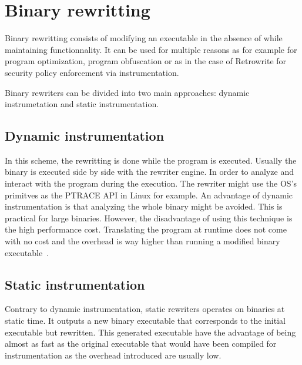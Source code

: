 \documentclass[a4paper,11pt,oneside]{report}
\newcommand{\sysname}{Retrowrite\xspace}
\begin{document}
\section{Binary rewritting}
Binary rewritting consists of modifying an executable in the absence of while
maintaining functionnality. It can be used for multiple reasons as for example
for program optimization, program obfuscation or as in the case of \sysname for
security policy enforcement via instrumentation. 


Binary rewriters can be divided into two main approaches: dynamic
instrumetation and static instrumentation.

\subsection{Dynamic instrumentation}
In this scheme, the rewritting is done while the program is executed. Usually
the binary is executed side by side with the rewriter engine. In order to
analyze and interact with the program during the execution. The rewriter might
use the OS's primitves as the PTRACE API in Linux for example.  An advantage of
dynamic instrumentation is that analyzing the whole binary might be avoided.
This is practical for large binaries. However, the disadvantage of using this
technique is the high performance cost. Translating the program at runtime does
not come with no cost and the overhead is way higher than running a modified
binary executable~\cite{dinesh20oakland}.


\subsection{Static instrumentation}
Contrary to dynamic instrumentation, static rewriters operates on binaries
at static time. It outputs a new binary
executable that corresponds to the initial executable but rewritten. This
generated executable have the advantage of being almost as fast as the original
executable that would have been compiled for instrumentation as the overhead
introduced are usually low.
\end{document}
